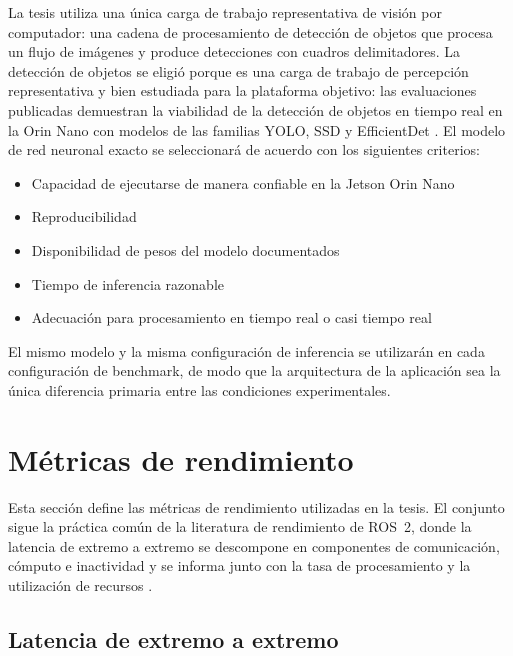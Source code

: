 La tesis utiliza una única carga de trabajo representativa de visión por
computador: una cadena de procesamiento de detección de objetos que procesa
un flujo de imágenes y produce detecciones con cuadros delimitadores. La
detección de objetos se eligió porque es una carga de trabajo de percepción
representativa y bien estudiada para la plataforma objetivo: las
evaluaciones publicadas demuestran la viabilidad de la detección de objetos
en tiempo real en la Orin Nano con modelos de las familias YOLO, SSD y
EfficientDet \cite{scalcon2024, alqahtani2026, szegedi2026, zequn2026}. El
modelo de red neuronal exacto se seleccionará de acuerdo con los siguientes
criterios:

\begin{itemize}
  \item Capacidad de ejecutarse de manera confiable en la Jetson Orin Nano
  \item Reproducibilidad
  \item Disponibilidad de pesos del modelo documentados
  \item Tiempo de inferencia razonable
  \item Adecuación para procesamiento en tiempo real o casi tiempo real
\end{itemize}


El mismo modelo y la misma configuración de inferencia se utilizarán en cada
configuración de benchmark, de modo que la arquitectura de la aplicación sea
la única diferencia primaria entre las condiciones experimentales.

\section{Métricas de rendimiento}
\label{sec:metrics}

Esta sección define las métricas de rendimiento utilizadas en la tesis. El
conjunto sigue la práctica común de la literatura de rendimiento de ROS~2,
donde la latencia de extremo a extremo se descompone en componentes de
comunicación, cómputo e inactividad \cite{betz2023a} y se informa junto con
la tasa de procesamiento y la utilización de recursos
\cite{mayoral-vilches2024, macenski2022}.

\subsection{Latencia de extremo a extremo}

